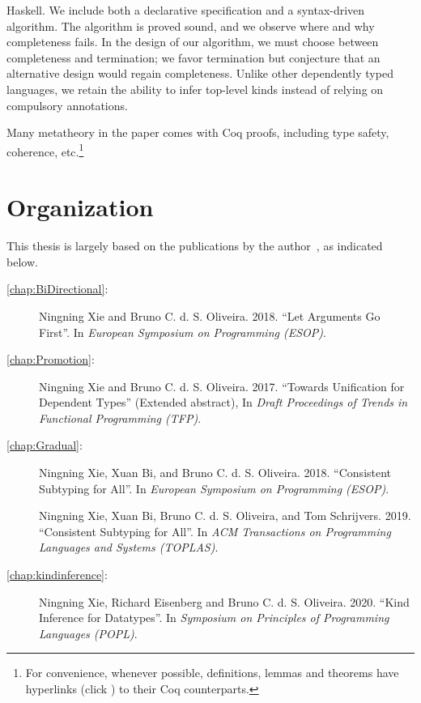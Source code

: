 \begin{description}
\begin{itemize}
\begin{itemize}
      Haskell. We include both a declarative specification and a syntax-driven
      algorithm. The algorithm is proved sound, and we observe where and why
      completeness fails. In the design of our algorithm, we must choose between
      completeness and termination; we favor termination but conjecture that an
      alternative design would regain completeness. Unlike other dependently typed
      languages, we retain the ability to infer top-level kinds instead of relying
      on compulsory annotations.
    \end{itemize}
  \end{itemize}
\end{description}

Many metatheory in the paper comes with Coq proofs, including type safety,
coherence, etc.\footnote{For convenience, whenever possible, definitions, lemmas
  and theorems have hyperlinks (click \leftpointright) to their Coq
  counterparts. }

\section{Organization}

This thesis is largely based on the
publications by the author~\citep{esop2018:arguments,esop2018:consistent,toplas:consistent,popl:kind,tfp},
as indicated below.
\begin{description}
\item[\cref{chap:BiDirectional}:] Ningning Xie and Bruno C. d. S.
  Oliveira. 2018. ``Let Arguments Go First''. In
  \emph{European Symposium on Programming (ESOP)}.
\item[\cref{chap:Promotion}:]
  Ningning Xie and Bruno C. d. S. Oliveira.
  2017. ``Towards Unification for Dependent Types'' (Extended abstract), In \emph{Draft Proceedings
    of Trends in Functional Programming (TFP)}.
\item[\cref{chap:Gradual}:] Ningning Xie, Xuan Bi, and Bruno C. d. S.
  Oliveira. 2018. ``Consistent Subtyping for All''. In
  \emph{European Symposium on Programming (ESOP)}.
\item[\quad\quad] Ningning Xie, Xuan Bi, Bruno C. d. S.
  Oliveira, and Tom Schrijvers. 2019. ``Consistent Subtyping for All''. In
  \emph{ACM Transactions on Programming Languages and Systems (TOPLAS)}.
\item[\cref{chap:kindinference}:]
  Ningning Xie, Richard Eisenberg and Bruno C. d. S. Oliveira. 2020. ``Kind
  Inference for Datatypes''. In \emph{Symposium on Principles of Programming
    Languages (POPL)}.
\end{description}


\noindent\makebox[\linewidth]{\rule{0.7\textwidth}{0.4pt}}

\vspace{1.5\baselineskip}



